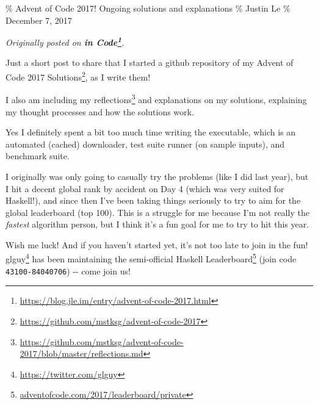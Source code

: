 \documentclass[]{article}
\renewcommand{\href}[2]{#2\footnote{\url{#1}}}
\begin{document}
\% Advent of Code 2017! Ongoing solutions and explanations \% Justin Le \%
December 7, 2017

\emph{Originally posted on
\textbf{\href{https://blog.jle.im/entry/advent-of-code-2017.html}{in Code}}.}

Just a short post to share that I started a github repository of my
\href{https://github.com/mstksg/advent-of-code-2017}{Advent of Code 2017
Solutions}, as I write them!

I also am including my
\href{https://github.com/mstksg/advent-of-code-2017/blob/master/reflections.md}{reflections}
and explanations on my solutions, explaining my thought processes and how the
solutions work.

Yes I definitely spent a bit too much time writing the executable, which is an
automated (cached) downloader, test suite runner (on sample inputs), and
benchmark suite.

I originally was only going to casually try the problems (like I did last year),
but I hit a decent global rank by accident on Day 4 (which was very suited for
Haskell!), and since then I've been taking things seriously to try to aim for
the global leaderboard (top 100). This is a struggle for me because I'm not
really the \emph{fastest} algorithm person, but I think it's a fun goal for me
to try to hit this year.

Wish me luck! And if you haven't started yet, it's not too late to join in the
fun! \href{https://twitter.com/glguy}{glguy} has been maintaining the
semi-official \href{adventofcode.com/2017/leaderboard/private}{Haskell
Leaderboard} (join code \texttt{43100-84040706}) -\/- come join us!
\end{document}
